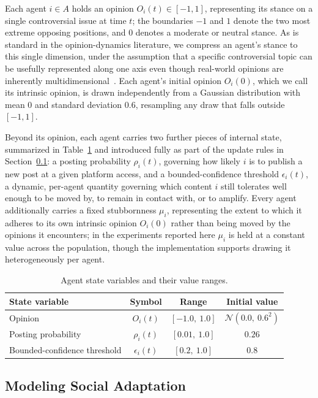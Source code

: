 \documentclass{svproc}
\begin{document}
Each agent $i\in A$ holds an opinion $O_i(t)\in[-1,1]$, representing its stance on a single controversial issue at time $t$; the boundaries $-1$ and $1$ denote the two most extreme opposing positions, and $0$ denotes a moderate or neutral stance. As is standard in the opinion-dynamics literature, we compress an agent's stance to this single dimension, under the assumption that a specific controversial topic can be usefully represented along one axis even though real-world opinions are inherently multidimensional~\cite{deffuant2000,hegselmann2002}. Each agent's initial opinion $O_i(0)$, which we call its intrinsic opinion, is drawn independently from a Gaussian distribution with mean $0$ and standard deviation $0.6$, resampling any draw that falls outside $[-1,1]$.

Beyond its opinion, each agent carries two further pieces of internal state, summarized in Table~\ref{tab:state} and introduced fully as part of the update rules in Section~\ref{sec:model-adaptation}: a posting probability $\rho_i(t)$, governing how likely $i$ is to publish a new post at a given platform access, and a bounded-confidence threshold $\epsilon_i(t)$, a dynamic, per-agent quantity governing which content $i$ still tolerates well enough to be moved by, to remain in contact with, or to amplify. Every agent additionally carries a fixed stubbornness $\mu_i$, representing the extent to which it adheres to its own intrinsic opinion $O_i(0)$ rather than being moved by the opinions it encounters; in the experiments reported here $\mu_i$ is held at a constant value across the population, though the implementation supports drawing it heterogeneously per agent.

\begin{table}[t]
\centering
\caption{Agent state variables and their value ranges.}\label{tab:state}
\begin{tabular}{lccc}
\toprule
State variable & Symbol & Range & Initial value \\
\midrule
Opinion & $O_i(t)$ & $[-1.0,\ 1.0]$ & $\mathcal{N}(0.0,\ 0.6^2)$ \\
Posting probability & $\rho_i(t)$ & $[0.01,\ 1.0]$ & $0.26$ \\
Bounded-confidence threshold & $\epsilon_i(t)$ & $[0.2,\ 1.0]$ & $0.8$ \\
\bottomrule
\end{tabular}
\end{table}

\subsection{Modeling Social Adaptation}\label{sec:model-adaptation}
\end{document}
